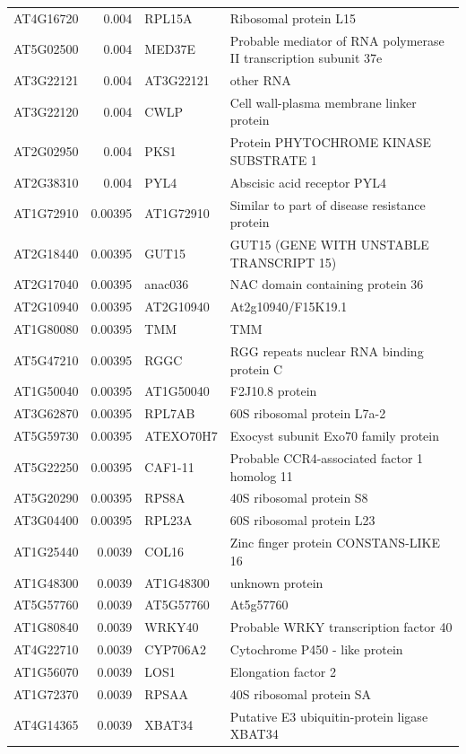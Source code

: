 \documentclass[11pt]{article}
\begin{document}
\begin{center}
\begin{tabular}{lrll}
AT4G16720 & 0.004 & RPL15A & Ribosomal protein L15\\
AT5G02500 & 0.004 & MED37E & Probable mediator of RNA polymerase II transcription subunit 37e\\
AT3G22121 & 0.004 & AT3G22121 & other RNA\\
AT3G22120 & 0.004 & CWLP & Cell wall-plasma membrane linker protein\\
AT2G02950 & 0.004 & PKS1 & Protein PHYTOCHROME KINASE SUBSTRATE 1\\
AT2G38310 & 0.004 & PYL4 & Abscisic acid receptor PYL4\\
AT1G72910 & 0.00395 & AT1G72910 & Similar to part of disease resistance protein\\
AT2G18440 & 0.00395 & GUT15 & GUT15 (GENE WITH UNSTABLE TRANSCRIPT 15)\\
AT2G17040 & 0.00395 & anac036 & NAC domain containing protein 36\\
AT2G10940 & 0.00395 & AT2G10940 & At2g10940/F15K19.1\\
AT1G80080 & 0.00395 & TMM & TMM\\
AT5G47210 & 0.00395 & RGGC & RGG repeats nuclear RNA binding protein C\\
AT1G50040 & 0.00395 & AT1G50040 & F2J10.8 protein\\
AT3G62870 & 0.00395 & RPL7AB & 60S ribosomal protein L7a-2\\
AT5G59730 & 0.00395 & ATEXO70H7 & Exocyst subunit Exo70 family protein\\
AT5G22250 & 0.00395 & CAF1-11 & Probable CCR4-associated factor 1 homolog 11\\
AT5G20290 & 0.00395 & RPS8A & 40S ribosomal protein S8\\
AT3G04400 & 0.00395 & RPL23A & 60S ribosomal protein L23\\
AT1G25440 & 0.0039 & COL16 & Zinc finger protein CONSTANS-LIKE 16\\
AT1G48300 & 0.0039 & AT1G48300 & unknown protein\\
AT5G57760 & 0.0039 & AT5G57760 & At5g57760\\
AT1G80840 & 0.0039 & WRKY40 & Probable WRKY transcription factor 40\\
AT4G22710 & 0.0039 & CYP706A2 & Cytochrome P450 - like protein\\
AT1G56070 & 0.0039 & LOS1 & Elongation factor 2\\
AT1G72370 & 0.0039 & RPSAA & 40S ribosomal protein SA\\
AT4G14365 & 0.0039 & XBAT34 & Putative E3 ubiquitin-protein ligase XBAT34\\

\end{tabular}
\end{center}
\end{document}
